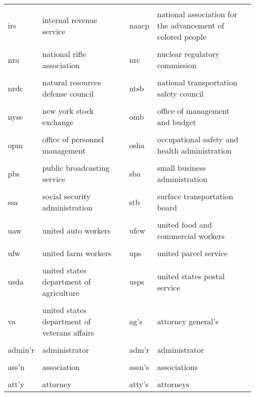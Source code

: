 \documentclass[10pt, letterpaper]{article}
\begin{document}
\begin{spacing}{1.0}
\begin{footnotesize}
\begin{longtable}[H]{p{1in}>{\raggedright}p{2in} p{0.2in} p{1in}>{\raggedright}p{2in} p{0in}}
    &  &  &  &  & \\[-6pt]
    irs & internal revenue service & & naacp & national association for the advancement of colored people &\\
    &  &  &  &  & \\[-6pt]
    nra & national rifle association & & nrc & nuclear regulatory commission &\\
    &  &  &  &  & \\[-6pt]
    nrdc & natural resources defense council & & ntsb & national transportation safety council &\\
    &  &  &  &  & \\[-6pt]
    nyse & new york stock exchange & & omb & office of management and budget &\\
    &  &  &  &  & \\[-6pt]
    opm & office of personnel management & & osha & occupational safety and health administration &\\
    &  &  &  &  & \\[-6pt]
    pbs & public broadcasting service & & sba & small business administration &\\
    &  &  &  &  & \\[-6pt]
    ssa & social security administration & & stb & surface transportation board &\\
    &  &  &  &  & \\[-6pt]
    uaw & united auto workers & & ufcw & united food and commercial workers &\\
    &  &  &  &  & \\[-6pt]
    ufw & united farm workers & & ups & united parcel service &\\
    &  &  &  &  & \\[-6pt]
    usda & united states department of agriculture & & usps & united states postal service &\\
    &  &  &  &  & \\[-6pt]
    va  & united states department of veterans affairs & & ag's & attorney general's &\\
    &  &  &  &  & \\[-6pt]
    admin'r & administrator & & adm'r & administrator &\\
    &  &  &  &  & \\[-6pt]
    ass'n & association & & assn's & associations &\\
    &  &  &  &  & \\[-6pt]
    att'y & attorney & & atty's & attorneys &\\

\end{longtable}
\end{footnotesize}
\end{spacing}
\end{document}
